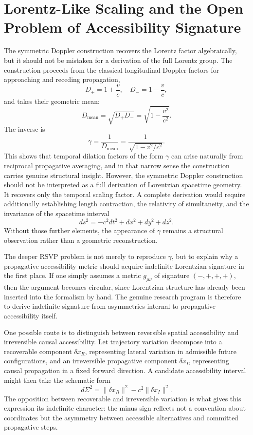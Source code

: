\documentclass[12pt,a4paper]{article}
\begin{document}
\section{Lorentz-Like Scaling and the Open Problem of Accessibility Signature}

The symmetric Doppler construction recovers the Lorentz factor algebraically, but it should not be mistaken for a derivation of the full Lorentz group. The construction proceeds from the classical longitudinal Doppler factors for approaching and receding propagation,
\[
D_+ = 1+\frac{v}{c},
\quad
D_- = 1-\frac{v}{c},
\]
and takes their geometric mean:
\[
D_{\mathrm{mean}}
=
\sqrt{D_+D_-}
=
\sqrt{1-\frac{v^2}{c^2}}.
\]
The inverse is
\[
\gamma
=
\frac{1}{D_{\mathrm{mean}}}
=
\frac{1}{\sqrt{1-v^2/c^2}}.
\]
This shows that temporal dilation factors of the form \(\gamma\) can arise naturally from reciprocal propagative averaging, and in that narrow sense the construction carries genuine structural insight. However, the symmetric Doppler construction should not be interpreted as a full derivation of Lorentzian spacetime geometry. It recovers only the temporal scaling factor. A complete derivation would require additionally establishing length contraction, the relativity of simultaneity, and the invariance of the spacetime interval
\[
ds^2 = -c^2dt^2 + dx^2 + dy^2 + dz^2.
\]
Without those further elements, the appearance of \(\gamma\) remains a structural observation rather than a geometric reconstruction.

The deeper RSVP problem is not merely to reproduce \(\gamma\), but to explain why a propagative accessibility metric should acquire indefinite Lorentzian signature in the first place. If one simply assumes a metric \(g_{\mu\nu}\) of signature \((-,+,+,+)\), then the argument becomes circular, since Lorentzian structure has already been inserted into the formalism by hand. The genuine research program is therefore to derive indefinite signature from asymmetries internal to propagative accessibility itself.

One possible route is to distinguish between reversible spatial accessibility and irreversible causal accessibility. Let trajectory variation decompose into a recoverable component \(\delta x_R\), representing lateral variation in admissible future configurations, and an irreversible propagative component \(\delta x_I\), representing causal propagation in a fixed forward direction. A candidate accessibility interval might then take the schematic form
\[
d\Sigma^2 = \|\delta x_R\|^2 - c^2\|\delta x_I\|^2.
\]
The opposition between recoverable and irreversible variation is what gives this expression its indefinite character: the minus sign reflects not a convention about coordinates but the asymmetry between accessible alternatives and committed propagative steps.
\end{document}
